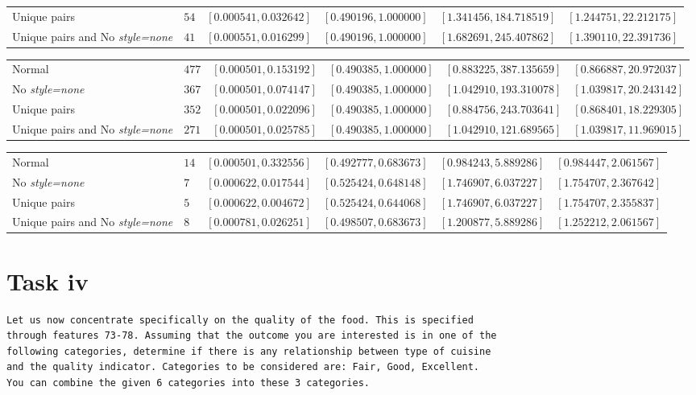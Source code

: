 \documentclass[letterpaper,10pt]{article}
\begin{document}
\begin{table}[h]
\begin{adjustbox}{max width=\textwidth}
\begin{tabular}{llllll}
Unique pairs & $54$ & $[0.000541,0.032642]$ & $[0.490196,1.000000]$ & $[1.341456,184.718519]$ & $[1.244751,22.212175]$ \\
Unique pairs and No \textit{style=none} & $41$ & $[0.000551,0.016299]$ & $[0.490196,1.000000]$ & $[1.682691,245.407862]$ & $[1.390110,22.391736]$ \\
\end{tabular}
\end{adjustbox}
\begin{adjustbox}{max width=\textwidth}
\begin{tabular}{llllll}
Normal & $477$ & $[0.000501,0.153192]$ & $[0.490385,1.000000]$ & $[0.883225,387.135659]$ & $[0.866887,20.972037]$ \\
No \textit{style=none} & $367$ & $[0.000501,0.074147]$ & $[0.490385,1.000000]$ & $[1.042910,193.310078]$ & $[1.039817,20.243142]$ \\
Unique pairs & $352$ & $[0.000501,0.022096]$ & $[0.490385,1.000000]$ & $[0.884756,243.703641]$ & $[0.868401,18.229305]$ \\
Unique pairs and No \textit{style=none} & $271$ & $[0.000501,0.025785]$ & $[0.490385,1.000000]$ & $[1.042910,121.689565]$ & $[1.039817,11.969015]$ \\
\end{tabular}
\end{adjustbox}
\begin{adjustbox}{max width=\textwidth}
\begin{tabular}{llllll}
Normal & $14$ & $[0.000501,0.332556]$ & $[0.492777,0.683673]$ & $[0.984243,5.889286]$ & $[0.984447,2.061567]$ \\
No \textit{style=none} & $7$ & $[0.000622,0.017544]$ & $[0.525424,0.648148]$ & $[1.746907,6.037227]$ & $[1.754707,2.367642]$ \\
Unique pairs & $5$ & $[0.000622,0.004672]$ & $[0.525424,0.644068]$ & $[1.746907,6.037227]$ & $[1.754707,2.355837]$ \\
Unique pairs and No \textit{style=none} & $8$ & $[0.000781,0.026251]$ & $[0.498507,0.683673]$ & $[1.200877,5.889286]$ & $[1.252212,2.061567]$ \\
\end{tabular}
\end{adjustbox}
\end{table}


\clearpage
\newpage
{}
\section*{Task iv}
\begin{verbatim}
Let us now concentrate specifically on the quality of the food. This is specified
through features 73-78. Assuming that the outcome you are interested is in one of the
following categories, determine if there is any relationship between type of cuisine
and the quality indicator. Categories to be considered are: Fair, Good, Excellent.
You can combine the given 6 categories into these 3 categories.
\end{verbatim}
\end{document}
